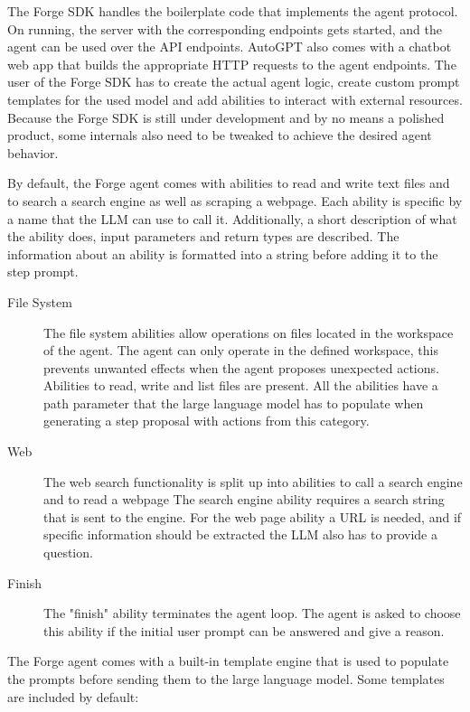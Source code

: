 \documentclass[../main.tex]{subfiles}
\begin{document}
The Forge SDK handles the boilerplate code that implements the agent protocol.
On running, the server with the corresponding endpoints gets started, and the agent can be used over the API endpoints.
AutoGPT also comes with a chatbot web app that builds the appropriate HTTP requests to the agent endpoints.
The user of the Forge SDK has to create the actual agent logic, create custom prompt templates for the used model and add abilities to interact with external resources.
Because the Forge SDK is still under development and by no means a polished product, some internals also need to be tweaked to achieve the desired agent behavior.

By default, the Forge agent comes with abilities to read and write text files and to search a search engine as well as scraping a webpage.
Each ability is specific by a name that the LLM can use to call it.
Additionally, a short description of what the ability does, input parameters and return types are described.
The information about an ability is formatted into a string before adding it to the step prompt.

\begin{description}
      \item[File System] The file system abilities allow operations on files located in the workspace of the agent.
            The agent can only operate in the defined workspace, this prevents unwanted effects when the agent proposes unexpected actions.
            Abilities to read, write and list files are present.
            All the abilities have a path parameter that the large language model has to populate when generating a step proposal with actions from this category.
      \item[Web] The web search functionality is split up into abilities to call a search engine and to read a webpage
            The search engine ability requires a search string that is sent to the engine.
            For the web page ability a URL is needed, and if specific information should be extracted the LLM also has to provide a question.
      \item[Finish] The "finish" ability terminates the agent loop.
            The agent is asked to choose this ability if the initial user prompt can be answered and give a reason.
\end{description}

The Forge agent comes with a built-in template engine that is used
to populate the prompts before sending them to the large language model.
Some templates are included by default:
\end{document}

